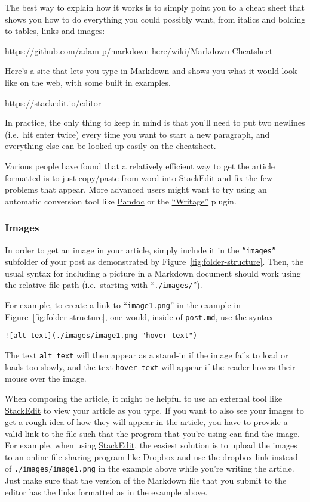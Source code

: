 \documentclass[paper=a4, fontsize=11pt]{scrartcl}
\numberwithin{equation}{section}        %
\numberwithin{figure}{section}            %
\numberwithin{table}{section}                %
\begin{document}
The best way to explain how it works is to simply point you to a cheat
sheet that shows you how to do everything you could possibly want,
from italics and bolding to tables, links and images:

\url{https://github.com/adam-p/markdown-here/wiki/Markdown-Cheatsheet}

Here's a site that lets you type in Markdown and shows you what it would
look like on the web, with some built in examples.

\url{https://stackedit.io/editor}

In practice, the only thing to keep in mind is that you'll need to put
two newlines (i.e.\ hit enter twice) every time you want to start a new
paragraph, and everything else can be looked up easily on the
\href{https://github.com/adam-p/markdown-here/wiki/Markdown-Cheatsheet}{cheatsheet}.

Various people have found
that a relatively efficient way to get the article formatted is to just copy/paste
from word into \href{https://stackedit.io/editor}{StackEdit} and fix the few problems that appear. More advanced users
might want to try using an automatic conversion tool like
\href{http://pandoc.org/demos.html}{Pandoc} or the
\href{http://www.writage.com/}{``Writage''} plugin.

\subsubsection{Images}\label{sec:image-links}
In order to get an image in your article, simply include it in the
\texttt{``images''} subfolder of your post as demonstrated by
Figure~\ref{fig:folder-structure}. Then, the usual syntax for including a
picture in a Markdown document should work using the relative file path
(i.e.\ starting with ``\texttt{./images/}'').

For example, to create a link to ``\texttt{image1.png}'' in the example in
Figure~\ref{fig:folder-structure}, one would, inside of \texttt{post.md}, use
the syntax

\begin{verbatim}![alt text](./images/image1.png "hover text")\end{verbatim}

The text \texttt{alt text} will then appear as a stand-in if the image fails to
load or loads too slowly, and the text \texttt{hover text} will appear if the
reader hovers their mouse over the image.

When composing the article, it might be helpful to use an external tool like
\href{https://stackedit.io/editor}{StackEdit} to view your article as you type.
If you want to also see your images to get a rough idea of how they will appear
in the article, you have to provide a valid link to the file such that the
program that you're using can find the image. For example, when using
\href{https://stackedit.io/editor}{StackEdit}, the easiest solution is to upload
the images to an online file sharing program like Dropbox and use the dropbox
link instead of \texttt{./images/image1.png} in the example above while you're
writing the article. Just make sure that the version of the Markdown file that you
submit to the editor has the links formatted as in the example above.
\end{document}
